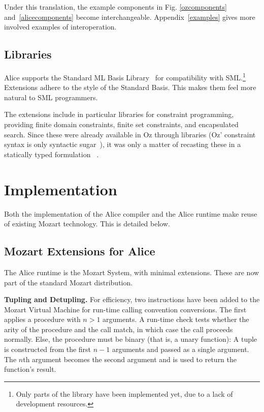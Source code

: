 \documentclass{entcs}
\begin{document}
Under this translation, the example components in Fig. \ref{ozcomponents}
and~\ref{alicecomponents} become interchangeable.  Appendix~\ref{examples}
gives more involved examples of interoperation.

\subsection{Libraries}

Alice supports the Standard ML Basis Library~\cite{SMLBasis} for
compatibility with SML.\footnote{Only parts of the library have been
implemented yet, due to a lack of development resources.}  Extensions
adhere to the style of the Standard Basis.  This makes them feel more
natural to SML programmers.

The extensions include in particular libraries for constraint programming,
providing finite domain constraints, finite set constraints, and
encapsulated search.  Since these were already available in Oz through
libraries (Oz' constraint syntax is only syntactic sugar~\cite{OzNotation}),
it was only a matter of recasting these in a statically typed formulation~%
\cite{Alice}.


\section{Implementation}\label{implementation}

Both the implementation of the Alice compiler and the Alice runtime make
reuse of existing Mozart technology.  This is detailed below.

\subsection{Mozart Extensions for Alice}

The Alice runtime is the Mozart System, with minimal extensions.
These are now part of the standard Mozart distribution.

{\bfseries Tupling and Detupling.}
For efficiency, two instructions have been added to the Mozart Virtual
Machine for run-time calling convention conversions.  The first applies
a procedure with $n > 1$ arguments.  A run-time check tests whether
the arity of the procedure and the call match, in which case the call
proceeds normally.  Else, the procedure must be binary (that is, a unary
function):  A tuple is constructed from the first $n - 1$ arguments and
passed as a single argument.  The $n$th argument becomes the second
argument and is used to return the function's result.
\end{document}
